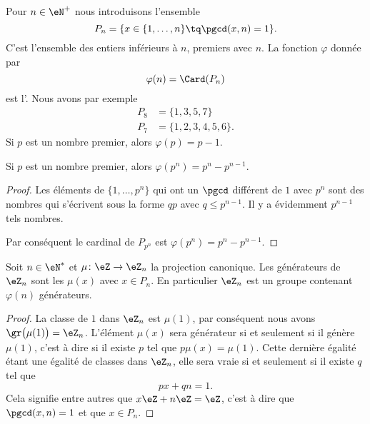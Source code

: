 Pour \( n\in\eN^+\) nous introduisons l'ensemble
\begin{equation}    \label{EqDefPnEntierldeost}
    P_n=\{ x\in\{ 1,\ldots,n \}\tq\pgcd(x,n)=1 \}.
\end{equation}
C'est l'ensemble des entiers inférieurs à \( n\), premiers avec \( n\). La fonction \( \varphi\) donnée par
\begin{equation}    \label{EqEulerGqPsvi}
    \varphi(n)=\Card(P_n)
\end{equation}
est l'. Nous avons par exemple
\begin{subequations}
    \begin{align}
        P_8&=\{ 1,3,5,7 \}\\
        P_7&=\{ 1,2,3,4,5,6 \}.
    \end{align}
\end{subequations}
Si \( p\) est un nombre premier, alors \( \varphi(p)=p-1\).

\begin{lemma}
    Si \( p\) est un nombre premier, alors \( \varphi(p^n)=p^n-p^{n-1}\).
\end{lemma}

\begin{proof}
    Les éléments de \( \{ 1,\ldots,p^n \}\) qui ont un \( \pgcd\) différent de \( 1\) avec \( p^n\) sont des nombres qui s'écrivent sous la forme \( qp\) avec \( q\leq p^{n-1}\). Il y a évidemment \( p^{n-1}\) tels nombres.

    Par conséquent le cardinal de \( P_{p^n}\) est \( \varphi(p^{n})=p^n-p^{n-1}\).
\end{proof}

\begin{proposition}     \label{PropZnmuphiGensn}
    Soit \( n\in\eN^*\) et \( \mu\colon \eZ\to \eZ_n\) la projection canonique. Les générateurs de \( \eZ_n\) sont les \( \mu(x)\) avec \( x\in P_n\). En particulier \( \eZ_n\) est un groupe contenant \( \varphi(n)\) générateurs.
\end{proposition}

\begin{proof}
    La classe de \( 1\) dans \( \eZ_n\) est \( \mu(1)\), par conséquent nous avons \( \gr\big( \mu(1) \big)=\eZ_n\). L'élément \( \mu(x)\) sera générateur si et seulement si il génère \( \mu(1)\), c'est à dire si il existe \( p\) tel que \( p\mu(x)=\mu(1)\). Cette dernière égalité étant une égalité de classes dans \( \eZ_n\), elle sera vraie si et seulement si il existe \( q\) tel que
    \begin{equation}
        px+qn=1.
    \end{equation}
    Cela signifie entre autres que \( x\eZ+n\eZ=\eZ\), c'est à dire que \( \pgcd(x,n)=1\) et que \( x\in P_n\).
\end{proof}


